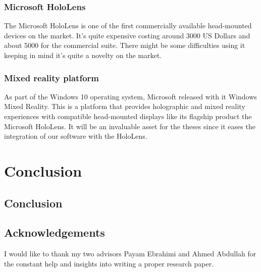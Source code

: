 \documentclass{article}
\begin{document}
\subsubsection{Microsoft HoloLens}
The Microsoft HoloLens is one of the first commercially available head-mounted devices on the market. It's quite expensive costing around 3000 US Dollars and about 5000 for the commercial suite. There might be some difficulties using it keeping in mind it's quite a novelty on the market.

\subsubsection{Mixed reality platform}
As part of the Windows 10 operating system, Microsoft released with it Windows Mixed Reality. This is a platform that provides holographic and mixed reality experiences with compatible head-mounted displays like its flagship product the Microsoft HoloLens.
It will be an invaluable asset for the theses since it eases the integration of our software with the HoloLens.

\section{Conclusion}

\subsection{Conclusion}
\subsection{Acknowledgements}
I would like to thank my two advisors Payam Ebrahimi and Ahmed Abdullah for the constant help and insights into writing a proper research paper. 



\end{document}
